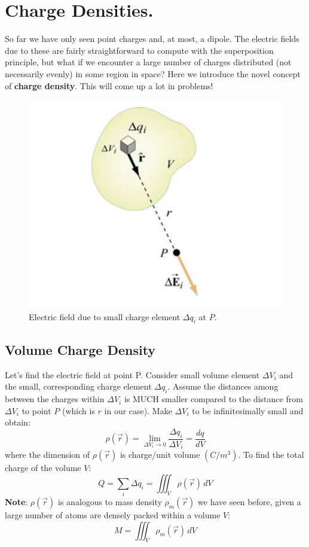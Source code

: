\documentclass[11pt, letterpaper]{article}
\begin{document}
\section{Charge Densities.}

So far we have only seen point charges and, at most, a dipole. The electric fields due to these are
fairly straightforward to compute with the superposition principle, but what if we encounter a large
number of charges distributed (not necessarily evenly) in some region in space? Here we introduce
the novel concept of \textbf{charge density}. This will come up a lot in problems!

\begin{figure}[h!]
	\centering
	\includegraphics[scale=0.65]{volume}
	\caption{Electric field due to small charge element $\Delta q_i$ at $P$.}
\end{figure}
	\subsection{Volume Charge Density}
	Let's find the electric field at point P. Consider small volume element $\Delta V_i$ and the small,
	corresponding charge element $\Delta q_i$. Assume the distances among between the charges
	within $\Delta V_i$ is MUCH smaller compared to the distance from $\Delta V_i$ to point $P$
	(which is $r$ in our case). Make $\Delta V_i$ to be infinitesimally small and obtain:
	\begin{equation}\label{eqn:volume-charge-density}
		\boxed{\rho(\vec{r}) = \lim_{\Delta V_i \to 0} \frac{\Delta q_i}{\Delta V_i} = \frac{dq}{dV}}
	\end{equation}
	where the dimension of $\rho(\vec{r})$ is charge/unit volume $(C/m^3)$. To find the total
	charge of the volume $V$:
		\[Q = \displaystyle\sum_{i} \Delta q_i = \displaystyle\iiint_{V} \rho(\vec{r}) \,dV\]
	\noindent\textbf{Note}: $\rho(\vec{r})$ is analogous to mass density $\rho_m(\vec{r})$ we
	have seen before, given a large number of atoms are densely packed within a volume $V$:
		\[M = \iiint_{V} \rho_m(\vec{r}) \,dV\]
	
\end{document}
